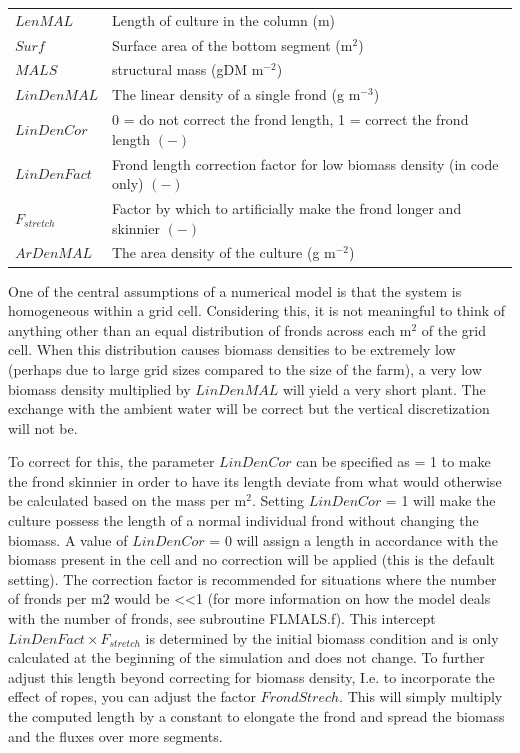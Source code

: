 \documentclass{deltares_manual}
\begin{document}
\begin{tabular}{ll}
$LenMAL$ & Length of culture in the column (m)\\
$Surf$ & Surface area of the bottom segment (m$^{2}$)\\
$MALS$ & structural mass (gDM m$^{-2}$)\\
$LinDenMAL$ & The linear density of a single frond (g m$^{-3}$)\\
$LinDenCor$ & 0 = do not correct the frond length, 1 = correct the frond length $(-)$\\
$LinDenFact$ & Frond length correction factor for low biomass density (in code only) $(-)$\\
$F_{stretch}$ & Factor by which to artificially make the frond longer and skinnier $(-)$\\

$ArDenMAL$ & The area density of the culture (g m$^{-2}$)\\
\end{tabular}

One of the central assumptions of a numerical model is that the system is homogeneous within a grid cell. Considering this, it is not meaningful to think of anything other than an equal distribution of fronds across each m$^{2}$ of the grid cell. When this distribution causes biomass densities to be extremely low (perhaps due to large grid sizes compared to the size of the farm), a very low biomass density multiplied by $LinDenMAL$ will yield a very short plant. The exchange with the ambient water will be correct but the vertical discretization will not be. 

To correct for this, the parameter $LinDenCor$ can be specified as = 1 to make the frond skinnier in order to have its length deviate from what would otherwise be calculated based on the mass per m$^2$. Setting $LinDenCor$ = 1 will make the culture possess the length of a normal individual frond without changing the biomass. A value of $LinDenCor$ = 0 will assign a length in accordance with the biomass present in the cell and no correction will be applied (this is the default setting). The correction factor is recommended for situations where the number of fronds per m${2}$ would be \textless\textless 1 (for more information on how the model deals with the number of fronds, see subroutine FLMALS.f). This intercept $LinDenFact \times F_{stretch}$ is determined by the initial biomass condition and is only calculated at the beginning of the simulation and does not change. To further adjust this length beyond correcting for biomass density, I.e. to incorporate the effect of ropes, you can adjust the factor $FrondStrech$. This will simply multiply the computed length by a constant to elongate the frond and spread the biomass and the fluxes over more segments.
\end{document}
